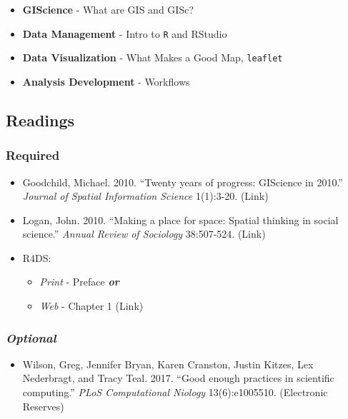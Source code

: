 \documentclass[]{book}
\providecommand{\tightlist}{%
  \setlength{\itemsep}{0pt}\setlength{\parskip}{0pt}}
\begin{document}
\begin{itemize}
\tightlist
\item
  \textbf{GIScience} - What are GIS and GISc?
\item
  \textbf{Data Management} - Intro to \texttt{R} and RStudio
\item
  \textbf{Data Visualization} - What Makes a Good Map, \texttt{leaflet}
\item
  \textbf{Analysis Development} - Workflows
\end{itemize}

\hypertarget{readings-2}{%
\subsection*{Readings}\label{readings-2}}

\hypertarget{required-2}{%
\subsubsection*{Required}\label{required-2}}

\begin{itemize}
\tightlist
\item
  Goodchild, Michael. 2010. ``Twenty years of progress: GIScience in 2010.'' \emph{Journal of Spatial Information Science} 1(1):3-20. (Link)
\item
  Logan, John. 2010. ``Making a place for space: Spatial thinking in social science.'' \emph{Annual Review of Sociology} 38:507-524. (Link)
\item
  R4DS:

  \begin{itemize}
  \tightlist
  \item
    \emph{Print} - Preface \textbf{\emph{or}}
  \item
    \emph{Web} - Chapter 1 (Link)
  \end{itemize}
\end{itemize}

\hypertarget{optional-1}{%
\subsubsection*{\texorpdfstring{\emph{Optional}}{Optional}}\label{optional-1}}

\begin{itemize}
\tightlist
\item
  Wilson, Greg, Jennifer Bryan, Karen Cranston, Justin Kitzes, Lex Nederbragt, and Tracy Teal. 2017. ``Good enough practices in scientific computing.'' \emph{PLoS Computational Niology} 13(6):e1005510. (Electronic Reserves)
\end{itemize}
\end{document}
